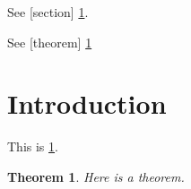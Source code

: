 \documentclass{amsart}
\newtheorem{theorem}{Theorem}
\begin{document}

See [section] \cref{sec:intro}.

See [theorem] \cref{thm:1}

\section{Introduction}
\label{sec:intro}

This is \cref{sec:intro}.

\begin{theorem}\label{thm:1}
Here is a theorem.
\end{theorem}
\end{document}
